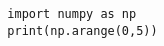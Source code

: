 \documentclass[12pt]{article}
\begin{document}
 
\begin{verbatim}
  import numpy as np
  print(np.arange(0,5))
\end{verbatim}
\end{document}
